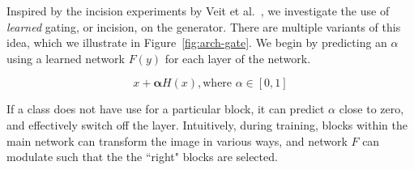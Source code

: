 
Inspired by the incision experiments by Veit et al.~\cite{veit2016residual,veit2018adaptive}, we investigate the use of \textit{learned} gating, or incision, on the generator. There are multiple variants of this idea, which we illustrate in Figure~\ref{fig:arch-gate}. We begin by predicting an $\alpha$ using a learned network $F(y)$ for each layer of the network.

\begin{equation}
x + \mathbf{\alpha} H(x), \text{where } \alpha \in [0,1]
\end{equation}

If a class does not have use for a particular block, it can predict $\alpha$ close to zero, and effectively switch off the layer. Intuitively, during training, blocks within the main network can transform the image in various ways, and network $F$ can modulate such that the the ``right" blocks are selected.

